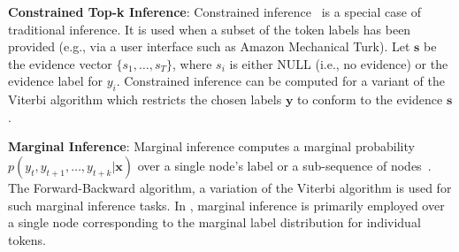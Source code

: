 
\textbf{Constrained Top-k Inference}: Constrained \topk inference~\cite{Kristjansson:2004:IIE:1597148.1597216} is a special case of traditional \topk inference.  It is used when a subset of the token labels has been provided (e.g., via a user interface such as Amazon Mechanical Turk).  Let $\mathbf{s}$ be the evidence vector $\{s_{1}, \dots, s_{T}\}$, where $s_{i}$ is either NULL (i.e., no evidence) or the evidence label for $y_{i}$.  Constrained \topk inference can be computed for a variant of the Viterbi algorithm which restricts the chosen labels $\mathbf{y}$ to conform to the evidence $\mathbf{s}$.

\textbf{Marginal Inference}: Marginal inference computes a marginal probability $p(y_{t},y_{t+1}, \dots, y_{t+k}|\mathbf{x})$ over a single node's label or a sub-sequence of nodes~\cite{sutton06introduction}.  The Forward-Backward algorithm, a variation of the Viterbi algorithm is used for such marginal inference tasks.  In \sysName, marginal inference is primarily employed over a single node corresponding to the marginal label distribution for individual tokens. 

